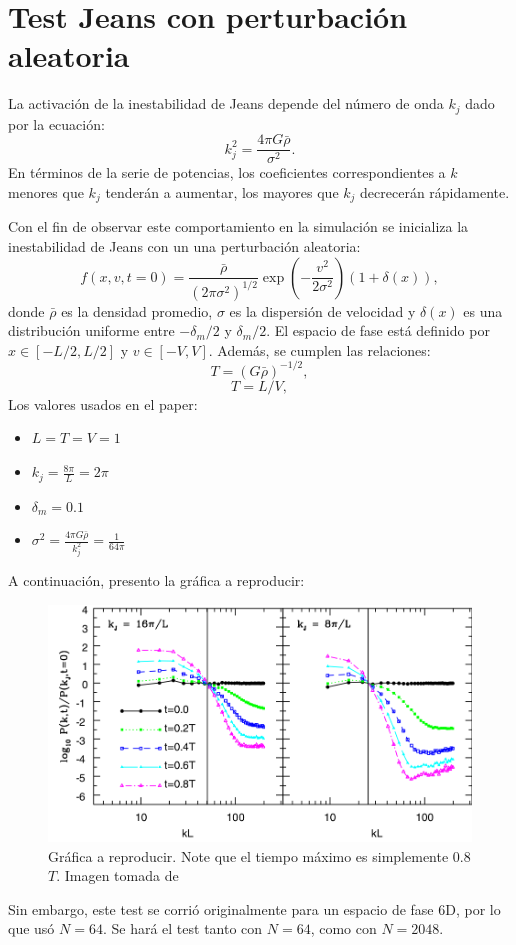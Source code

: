 \documentclass[notitlepage,letterpaper,12pt]{article} %
\begin{document}
\section{Test Jeans con perturbación aleatoria}
La activación de la inestabilidad de Jeans depende del número de onda $k_j$ dado por la ecuación:
\begin{equation}
\label{eq: k_j}
k_j^2 = \frac{4 \pi G \bar{\rho}}{\sigma^2}.
\end{equation}
En términos de la serie de potencias, los coeficientes correspondientes a $k$ menores que $k_j$ tenderán a aumentar, los mayores que $k_j$ decrecerán rápidamente. 

Con el fin de observar este comportamiento en la simulación se inicializa la inestabilidad de Jeans con un una perturbación aleatoria:
\begin{equation}
f(x,v,t = 0) = \frac{\bar{\rho}}{(2\pi \sigma^2)^{1/2}} \exp(-\frac{v^2}{2 \sigma^2}) (1 + \delta(x)),
\end{equation} 
donde $\bar{\rho}$ es la densidad promedio, $\sigma$ es la dispersión de velocidad y $\delta(x)$ es una distribución uniforme entre $-\delta_m/2$ y $\delta_m/2$.
El espacio de fase está definido por $x \in [-L/2,L/2]$ y $v \in [-V,V]$. 
Además, se cumplen las relaciones:
\begin{equation}
T = (G\bar{\rho})^{-1/2},
\end{equation}
\begin{equation}
T = L/V,
\end{equation}
Los valores usados en el paper: 
\begin{itemize}
\item $L = T =  V =  1$
\item $k_j = \frac{8 \pi}{L} = 2\pi$
\item $\delta_m = 0.1$
\item $\sigma^2 = \frac{4 \pi G \bar{\rho}}{k_j^2} = \frac{1}{64 \pi}$
\end{itemize}

A continuación, presento la gráfica a reproducir:
\begin{figure}[H]
  \centering
   \includegraphics[scale= 0.35]{toReproduceSpectrum.png}
  \caption{Gráfica a reproducir. Note que el tiempo máximo es simplemente 0.8$T$. Imagen tomada de \cite{2013ApJ...762..116Y}}
  \label{fig: toReproduceSpectrum}
\end{figure}
Sin embargo, este test se corrió originalmente para un espacio de fase 6D, por lo que usó $N = 64$. Se hará el test tanto con $N = 64$, como con $N=2048$.
\end{document}
